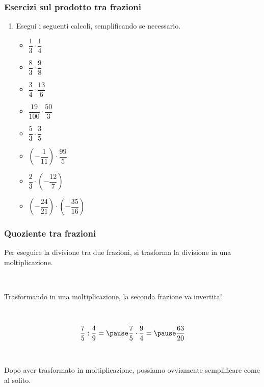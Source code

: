 \documentclass[]{beamer}
\theoremstyle{plain}
\begin{document}
\begin{frame}
\frametitle{Esercizi sul prodotto tra frazioni}
\begin{enumerate}
  \item Esegui i seguenti calcoli, semplificando se necessario.
  \begin{multicols}{2}
    \begin{itemize}
        \item $ \dfrac{1}{3} \cdot \dfrac{1}{4} $
        
        \vspace*{.5cm}
        \item $ \dfrac{8}{3} \cdot \dfrac{9}{8} $
        
        \vspace*{.5cm}
        \item $ \dfrac{3}{4} \cdot \dfrac{13}{6} $
        
        \vspace*{.5cm}
        \item $ \dfrac{19}{100} \cdot \dfrac{50}{3} $
        \item $ \dfrac{5}{3} \cdot \dfrac{3}{5} $
        
        \vspace*{.5cm}
        \item $ \left(-\dfrac{1}{11}\right) \cdot \dfrac{99}{5} $
        
        \vspace*{.5cm}
        \item $ \dfrac{2}{3} \cdot \left(-\dfrac{12}{7} \right)$
        
        \vspace*{.5cm}
        \item $ \left(-\dfrac{24}{21}\right) \cdot \left(-\dfrac{35}{16}\right)  $
    \end{itemize}
  \end{multicols}
\end{enumerate}
\end{frame}


\begin{frame}
\frametitle{Quoziente tra frazioni}
Per eseguire la divisione tra due frazioni, \alert{si trasforma la divisione in una moltiplicazione}.\pause

~

Trasformando in una moltiplicazione, \alert{la seconda frazione va invertita}!\pause

~

\[ \frac{7}{5} : \frac{4}{9} = \pause \frac{7}{5} \cdot \frac{9}{4} = \pause \frac{63}{20} \]\pause

~

\alert{Dopo aver trasformato in moltiplicazione, possiamo ovviamente semplificare come al solito.}
\end{frame}
\end{document}
